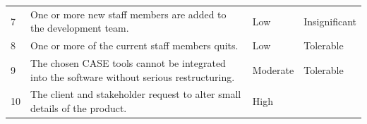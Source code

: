 \documentclass[]{article}
\begin{document}
\begin{longtable}[c]{@{}llll@{}}
\begin{minipage}[t]{0.22\columnwidth}
7
\end{minipage} & \begin{minipage}[t]{0.22\columnwidth}\raggedright
One or more new staff members are added to the development team.
\end{minipage} & \begin{minipage}[t]{0.22\columnwidth}\raggedright
Low
\end{minipage} & \begin{minipage}[t]{0.22\columnwidth}\raggedright
Insignificant
\end{minipage}
\\\addlinespace
\begin{minipage}[t]{0.22\columnwidth}\raggedright
8
\end{minipage} & \begin{minipage}[t]{0.22\columnwidth}\raggedright
One or more of the current staff members quits.
\end{minipage} & \begin{minipage}[t]{0.22\columnwidth}\raggedright
Low
\end{minipage} & \begin{minipage}[t]{0.22\columnwidth}\raggedright
Tolerable
\end{minipage}
\\\addlinespace
\begin{minipage}[t]{0.22\columnwidth}\raggedright
9
\end{minipage} & \begin{minipage}[t]{0.22\columnwidth}\raggedright
The chosen CASE tools cannot be integrated into the software without
serious restructuring.
\end{minipage} & \begin{minipage}[t]{0.22\columnwidth}\raggedright
Moderate
\end{minipage} & \begin{minipage}[t]{0.22\columnwidth}\raggedright
Tolerable
\end{minipage}
\\\addlinespace
\begin{minipage}[t]{0.22\columnwidth}\raggedright
10
\end{minipage} & \begin{minipage}[t]{0.22\columnwidth}\raggedright
The client and stakeholder request to alter small details of the
product.
\end{minipage} & \begin{minipage}[t]{0.22\columnwidth}\raggedright
High
\end{minipage} & \begin{minipage}[t]{0.22\columnwidth}\raggedright

\end{minipage}
\end{longtable}
\end{document}
